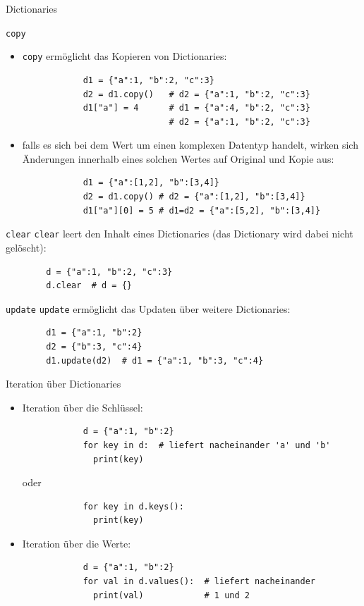 \documentclass[utf8, smaller, c]{beamer}
\renewcommand{\tt}[1]{{\texttt{#1}}}
\begin{document}
\begin{frame}{Dictionaries}
	\begin{block}{\tt{copy}}
		\begin{itemize}
			\item \verb+copy+ ermöglicht das Kopieren von Dictionaries:
			\begin{verbatim}
			d1 = {"a":1, "b":2, "c":3}
			d2 = d1.copy()   # d2 = {"a":1, "b":2, "c":3}
			d1["a"] = 4      # d1 = {"a":4, "b":2, "c":3}
			                 # d2 = {"a":1, "b":2, "c":3}
			\end{verbatim}
			\item falls es sich bei dem Wert um einen komplexen Datentyp handelt, wirken sich Änderungen innerhalb
			eines solchen Wertes auf Original und Kopie aus:
			\begin{verbatim}
			d1 = {"a":[1,2], "b":[3,4]}
			d2 = d1.copy() # d2 = {"a":[1,2], "b":[3,4]}
			d1["a"][0] = 5 # d1=d2 = {"a":[5,2], "b":[3,4]}  
			\end{verbatim}
		\end{itemize}
	\end{block}

	\pagebreak

	\begin{block}{\tt{clear}}
		\verb+clear+ leert den Inhalt eines Dictionaries (das Dictionary wird dabei nicht gelöscht):
		\begin{verbatim}
		d = {"a":1, "b":2, "c":3}
		d.clear  # d = {}
		\end{verbatim}
	\end{block}
	\begin{block}{\tt{update}}
		\verb+update+ ermöglicht das Updaten über weitere Dictionaries:
		\begin{verbatim}
		d1 = {"a":1, "b":2}
		d2 = {"b":3, "c":4}
		d1.update(d2)  # d1 = {"a":1, "b":3, "c":4}
		\end{verbatim}
	\end{block}

	\pagebreak

	\begin{block}{Iteration über Dictionaries}
		\begin{itemize}
			\item Iteration über die Schlüssel: 
			\begin{verbatim}
			d = {"a":1, "b":2}
			for key in d:  # liefert nacheinander 'a' und 'b'
			  print(key)
			\end{verbatim}
			\vspace*{2mm}
			oder
			\vspace*{2mm}
			\begin{verbatim}
			for key in d.keys():
			  print(key)
			\end{verbatim}
			\item Iteration über die Werte:
			\begin{verbatim}
			d = {"a":1, "b":2}
			for val in d.values():  # liefert nacheinander
			  print(val)            # 1 und 2
			\end{verbatim}
		\end{itemize}
	\end{block}


\end{frame}
\end{document}
